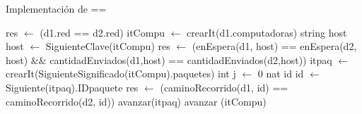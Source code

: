 \begin{Algoritmos}
\begin{algorithm}
\caption{Implementaci\'on de ==}
\begin{algorithmic}[0]
	\State res $\gets$ (d1.red == d2.red)						
	 													
		\State itCompu $\gets$ crearIt(d1.computadoras)  		
		\State string host 										
			
			\State host $\gets$ SiguienteClave(itCompu)			 
			\State res $\gets$ (enEspera(d1, host) == enEspera(d2, host) $\&\&$ \newline  cantidadEnviados(d1,host) == cantidadEnviados(d2,host))  
			\State itpaq $\gets$ crearIt(SiguienteSignificado(itCompu).paquetes) 
			\State int j $\gets$ 0												
			\State nat id														
				
				\State id $\gets$ Siguiente(itpaq).IDpaquete 					
				\State res $\gets$ (caminoRecorrido(d1, id) == caminoRecorrido(d2, id)) 
				\State avanzar(itpaq)											
			\EndWhile
		\State avanzar (itCompu)													
		\EndWhile
	\EndIf
\EndFunction
\end{algorithmic}
\end{algorithm}

\end{Algoritmos}

\clearpage


